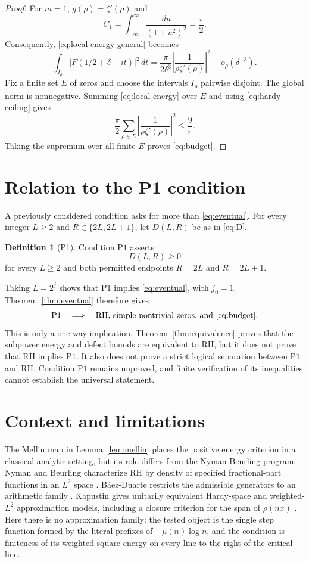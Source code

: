 \documentclass[11pt,a4paper]{amsart}
\theoremstyle{definition}
\newtheorem{definition}[theorem]{Definition}
\theoremstyle{remark}
\newcommand{\Pone}{\mathrm{P1}}
\begin{document}
\begin{proof}
For $m=1$, $g(\rho)=\zeta'(\rho)$ and
\[
 C_1=\int_{-\infty}^{\infty}\frac{du}{(1+u^2)^2}=\frac{\pi}{2}.
\]
Consequently, \eqref{eq:local-energy-general} becomes
\begin{equation}\label{eq:local-energy}
 \int_{I_\rho}|F(1/2+\delta+it)|^2\,dt
 =\frac{\pi}{2\delta^3}
 \left|\frac{1}{\rho\zeta'(\rho)}\right|^2
 +o_\rho(\delta^{-3}).
\end{equation}
Fix a finite set $E$ of zeros and choose the intervals $I_\rho$ pairwise
disjoint.  The global norm is nonnegative.  Summing
\eqref{eq:local-energy} over $E$ and using \eqref{eq:hardy-ceiling} gives
\[
 \frac{\pi}{2}\sum_{\rho\in E}
\left|\frac{1}{\rho\zeta'(\rho)}\right|^2
 \leq\frac{9}{\pi}.
\]
Taking the supremum over all finite $E$ proves \eqref{eq:budget}.
\end{proof}

\section{Relation to the P1 condition}

A previously considered condition asks for more than
\eqref{eq:eventual}.  For every integer $L\geq2$ and
$R\in\{2L,2L+1\}$, let $D(L,R)$ be as in \eqref{eq:D}.

\begin{definition}[P1]\label{def:P1}
Condition $\Pone$ asserts
\[
 D(L,R)\geq0
\]
for every $L\geq2$ and both permitted endpoints $R=2L$ and $R=2L+1$.
\end{definition}

Taking $L=2^j$ shows that $\Pone$ implies \eqref{eq:eventual}, with
$j_0=1$.  Theorem~\ref{thm:eventual} therefore gives
\[
 \Pone\quad\Longrightarrow\quad
 \text{RH, simple nontrivial zeros, and \eqref{eq:budget}}.
\]
This is only a one-way implication.  Theorem~\ref{thm:equivalence} proves
that the subpower energy and defect bounds are equivalent to RH, but it does
not prove that RH implies $\Pone$.  It also does not prove a strict logical
separation between $\Pone$ and RH.  Condition $\Pone$ remains unproved, and
finite verification of its inequalities cannot establish the universal
statement.

\section{Context and limitations}

The Mellin map in Lemma~\ref{lem:mellin} places the positive energy criterion
in a classical analytic setting, but its role differs from the
Nyman-Beurling program.  Nyman and Beurling characterize RH by density of
specified fractional-part functions in an $L^2$ space
\cite{Nyman1950,Beurling1955}.  B\'aez-Duarte restricts the admissible
generators to an arithmetic family \cite{BaezDuarte2003}.  Kapustin gives
unitarily equivalent Hardy-space and weighted-$L^2$ approximation models,
including a closure criterion for the span of $\rho(nx)$
\cite[Theorem~1]{Kapustin2019}.  Here there is no approximation family: the tested
object is the single step function formed by the literal prefixes of
$-\mu(n)\log n$, and the condition is finiteness of its weighted square
energy on every line to the right of the critical line.
\end{document}

